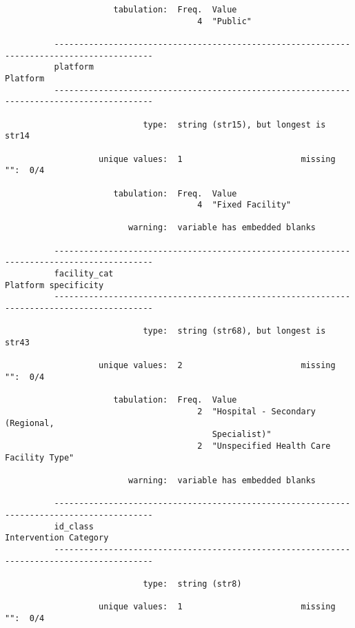 \documentclass{article}
\begin{document}
\begin{verbatim}
                      tabulation:  Freq.  Value
                                       4  "Public"
          
          ------------------------------------------------------------------------------------------
          platform                                                                          Platform
          ------------------------------------------------------------------------------------------
          
                            type:  string (str15), but longest is str14
          
                   unique values:  1                        missing "":  0/4
          
                      tabulation:  Freq.  Value
                                       4  "Fixed Facility"
          
                         warning:  variable has embedded blanks
          
          ------------------------------------------------------------------------------------------
          facility_cat                                                          Platform specificity
          ------------------------------------------------------------------------------------------
          
                            type:  string (str68), but longest is str43
          
                   unique values:  2                        missing "":  0/4
          
                      tabulation:  Freq.  Value
                                       2  "Hospital - Secondary (Regional,
                                          Specialist)"
                                       2  "Unspecified Health Care Facility Type"
          
                         warning:  variable has embedded blanks
          
          ------------------------------------------------------------------------------------------
          id_class                                                             Intervention Category
          ------------------------------------------------------------------------------------------
          
                            type:  string (str8)
          
                   unique values:  1                        missing "":  0/4
          

\end{verbatim}
\end{document}
